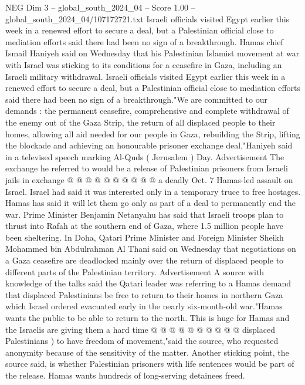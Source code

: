 \begin{textsample}{NEG Dim 3 – global\_south\_2024\_04 – Score 1.00 – global\_south\_2024\_04/107172721.txt}  \label{ex:f3_neg_268}
Israeli officials visited Egypt earlier this week in a renewed effort to secure a deal, but a Palestinian official close to mediation efforts said there had been no sign of a breakthrough.
Hamas chief Ismail Haniyeh said on Wednesday that his Palestinian Islamist movement at war with Israel was sticking to its conditions for a ceasefire in Gaza, including an Israeli military withdrawal.
Israeli officials visited Egypt earlier this week in a renewed effort to secure a deal, but a Palestinian official close to mediation efforts said there had been no sign of a breakthrough."We are committed to our demands : the permanent ceasefire, comprehensive and complete withdrawal of the enemy out of the Gaza Strip, the return of all displaced people to their homes, allowing all aid needed for our people in Gaza, rebuilding the Strip, lifting the blockade and achieving an honourable prisoner exchange deal,"Haniyeh said in a televised speech marking Al-Quds ( Jerusalem ) Day.
Advertisement The exchange he referred to would be a release of Palestinian prisoners from Israeli jails in exchange @ @ @ @ @ @ @ @ @ @ a deadly Oct. 7 Hamas-led assault on Israel.
Israel had said it was interested only in a temporary truce to free hostages.
Hamas has said it will let them go only as part of a deal to permanently end the war.
Prime Minister Benjamin Netanyahu has said that Israeli troops plan to thrust into Rafah at the southern end of Gaza, where 1.5 million people have been sheltering.
In Doha, Qatari Prime Minister and Foreign Minister Sheikh Mohammed bin Abdulrahman Al Thani said on Wednesday that negotiations on a Gaza ceasefire are deadlocked mainly over the return of displaced people to different parts of the Palestinian territory.
Advertisement A source with knowledge of the talks said the Qatari leader was referring to a Hamas demand that displaced Palestinians be free to return to their homes in northern Gaza which Israel ordered evacuated early in the nearly six-month-old war."Hamas wants the public to be able to return to the north.
This is huge for Hamas and the Israelis are giving them a hard time @ @ @ @ @ @ @ @ @ @ displaced Palestinians ) to have freedom of movement,"said the source, who requested anonymity because of the sensitivity of the matter.
Another sticking point, the source said, is whether Palestinian prisoners with life sentences would be part of the release.
Hamas wants hundreds of long-serving detainees freed.

\end{textsample}
